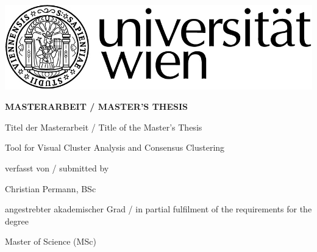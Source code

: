 \begin{titlepage}
\vspace*{-2cm}  %
\begin{flushright}
	\includegraphics[width=.5\textwidth]{titlepage/RZ_Logo_Uni_sw_01.jpg}
\end{flushright}
\vspace{1cm}

\begin{center}  %
    \huge{\textbf{\textsf{\MakeUppercase{
        MASTERARBEIT / MASTER'S THESIS
    }}}}
    \vspace{2cm}

    \large{\textsf{  %
        Titel der Masterarbeit / Title of the Master's Thesis
    }}
    \vspace{.1cm}

    \LARGE{\textsf{  %
        {\glqq}Tool for Visual Cluster Analysis and Consensus Clustering\grqq
    }}
    \vspace{2cm}

    \large{\textsf{  %
        verfasst von / submitted by
    }}

    \Large{\textsf{  %
        Christian Permann, BSc
    }}
    \vspace{2cm}

    \large{\textsf{
        angestrebter akademischer Grad / in partial fulfilment of the requirements for the degree  %
    }}

    \Large{\textsf{  %
				Master of Science (MSc)
    }}
\end{center}
\vspace{2cm}


\end{titlepage}
